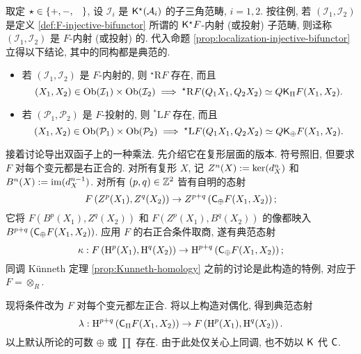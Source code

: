 取定 $\star \in \{+, -, \hspace{0.8em}\}$, 设 $\mathcal{I}_i$ 是 $\mathsf{K}^\star(\mathcal{A}_i)$ 的子三角范畴, $i=1,2$. 按往例, 若 $(\mathcal{I}_1, \mathcal{I}_2)$ 是定义 \ref{def:F-injective-bifunctor} 所谓的 $\mathsf{K}^\star F$-内射 (或投射) 子范畴, 则迳称 $(\mathcal{I}_1, \mathcal{I}_2)$ 是 $F$-内射 (或投射) 的. 代入命题 \ref{prop:localization-injective-bifunctor} 立得以下结论, 其中的同构都是典范的.
 

\begin{itemize}
	\item 若 $(\mathcal{I}_1, \mathcal{I}_2)$ 是 $F$-内射的, 则 ${}^\star \mathrm{R}F$ 存在, 而且
	\begin{equation}\label{eqn:derived-bifunctor-1}
		(X_1, X_2) \in \operatorname{Ob}(\mathcal{I}_1) \times \operatorname{Ob}(\mathcal{I}_2) \implies {}^\star \mathrm{R}F(Q_1 X_1, Q_2 X_2) \simeq Q \mathsf{K}_{\Pi}F(X_1, X_2).
	\end{equation}
	\item 若 $(\mathcal{P}_1, \mathcal{P}_2)$ 是 $F$-投射的, 则 ${}^* \mathrm{L}F$ 存在, 而且
	\begin{equation}\label{eqn:derived-bifunctor-2}
		(X_1, X_2) \in \operatorname{Ob}(\mathcal{P}_1) \times \operatorname{Ob}(\mathcal{P}_2) \implies {}^\star \mathrm{L}F(Q_1 X_1, Q_2 X_2) \simeq Q \mathsf{K}_{\oplus}F(X_1, X_2).
	\end{equation}
\end{itemize}

接着讨论导出双函子上的一种乘法. 先介绍它在复形层面的版本. 符号照旧, 但要求 $F$ 对每个变元都是右正合的. 对所有复形 $X$, 记 $Z^n(X) := \operatorname{ker}(d_X^n)$ 和 $B^n(X) := \operatorname{im}(d_X^{n-1})$. 对所有 $(p,q) \in \mathbb{Z}^2$ 皆有自明的态射
\[ F\left( Z^p(X_1), Z^q(X_2) \right) \to Z^{p+q}\left( \mathsf{C}_{\oplus}F(X_1, X_2) \right); \]
它将 $F(B^p(X_1), Z^q(X_2))$ 和 $F(Z^p(X_1), B^q(X_2))$ 的像都映入 $B^{p+q}\left( \mathsf{C}_{\oplus}F(X_1, X_2) \right)$. 应用 $F$ 的右正合条件取商, 遂有典范态射
\[ \kappa: F\left(\operatorname{H}^p(X_1), \operatorname{H}^q(X_2)\right) \to \operatorname{H}^{p+q}\left( \mathsf{C}_{\oplus} F(X_1, X_2) \right); \]
同调 Künneth 定理 \ref{prop:Kunneth-homology} 之前的讨论是此构造的特例, 对应于 $F = \otimes_R$.

现将条件改为 $F$ 对每个变元都左正合. 将以上构造对偶化, 得到典范态射
\[ \lambda: \operatorname{H}^{p+q}\left( \mathsf{C}_{\Pi} F(X_1, X_2) \right) \to F\left( \operatorname{H}^p(X_1), \operatorname{H}^q(X_2) \right). \]
以上默认所论的可数 $\oplus$ 或 $\prod$ 存在. 由于此处仅关心上同调, 也不妨以 $\mathsf{K}$ 代 $\mathsf{C}$.

